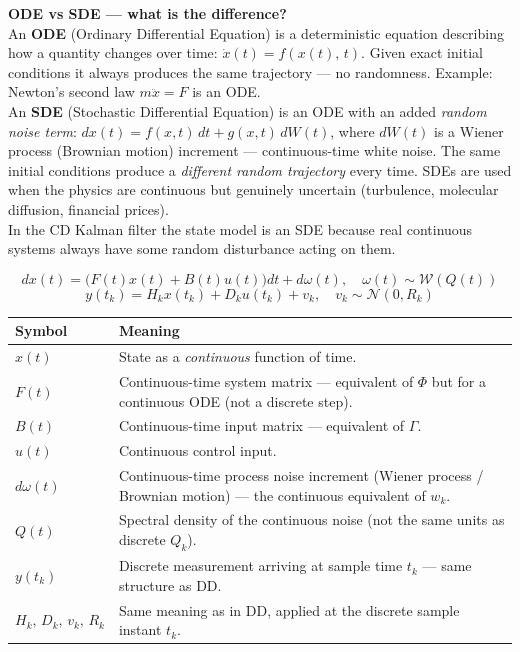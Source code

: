 \documentclass[12pt, a4paper]{article}
\begin{document}
\begin{notebox}
  \textbf{ODE vs SDE --- what is the difference?}\\
  An \textbf{ODE} (Ordinary Differential Equation) is a deterministic
  equation describing how a quantity changes over time:
  $\dot{x}(t) = f(x(t),\,t)$.
  Given exact initial conditions it always produces the same
  trajectory --- no randomness.
  Example: Newton's second law $m\ddot{x} = F$ is an ODE.\\[4pt]
  An \textbf{SDE} (Stochastic Differential Equation) is an ODE with
  an added \emph{random noise term}:
  $dx(t) = f(x,t)\,dt + g(x,t)\,dW(t)$,
  where $dW(t)$ is a Wiener process (Brownian motion) increment ---
  continuous-time white noise.
  The same initial conditions produce a \emph{different random
  trajectory} every time.
  SDEs are used when the physics are continuous but genuinely
  uncertain (turbulence, molecular diffusion, financial prices).\\[4pt]
  In the CD Kalman filter the state model is an SDE because real
  continuous systems always have some random disturbance acting on
  them.
\end{notebox}

\[
  dx(t) = \bigl(F(t)x(t) + B(t)u(t)\bigr)dt + d\omega(t),
  \quad \omega(t) \sim \mathcal{W}(Q(t))
\]
\[
  y(t_k) = H_k x(t_k) + D_k u(t_k) + v_k,
  \quad v_k \sim \mathcal{N}(0, R_k)
\]

\begin{center}
\renewcommand{\arraystretch}{1.4}
\begin{tabular}{p{1.8cm} p{12.2cm}}
  \toprule
  \textbf{Symbol} & \textbf{Meaning} \\
  \midrule
  $x(t)$ & State as a \emph{continuous} function of time. \\
  $F(t)$ & Continuous-time system matrix --- equivalent of $\Phi$ but
           for a continuous ODE (not a discrete step). \\
  $B(t)$ & Continuous-time input matrix --- equivalent of $\Gamma$. \\
  $u(t)$ & Continuous control input. \\
  $d\omega(t)$ & Continuous-time process noise increment (Wiener process
                 / Brownian motion) --- the continuous equivalent of $w_k$. \\
  $Q(t)$ & Spectral density of the continuous noise (not the same units
           as discrete $Q_k$). \\
  $y(t_k)$ & Discrete measurement arriving at sample time $t_k$ ---
             same structure as DD. \\
  $H_k,\,D_k,\,v_k,\,R_k$ & Same meaning as in DD, applied at the
                              discrete sample instant $t_k$. \\
  \bottomrule
\end{tabular}
\end{center}
\end{document}
